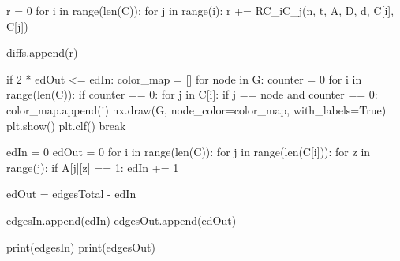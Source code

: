 \begin{latin}
\begin{python}
    r = 0
    for i in range(len(C)):
        for j in range(i):
            r += RC_iC_j(n, t, A, D, d, C[i], C[j])

    diffs.append(r)

    if 2 * edOut <= edIn:
        color_map = []
        for node in G:
            counter = 0
            for i in range(len(C)):
                if counter == 0:
                    for j in C[i]:
                        if j == node and counter == 0:
                            color_map.append(i)
        nx.draw(G, node_color=color_map, with_labels=True)
        plt.show()
        plt.clf()
        break

edIn = 0
edOut = 0
for i in range(len(C)):
    for j in range(len(C[i])):
        for z in range(j):
            if A[j][z] == 1:
                edIn += 1

edOut = edgesTotal - edIn

edgesIn.append(edIn)
edgesOut.append(edOut)

print(edgesIn)
print(edgesOut)
\end{python}
\end{latin}